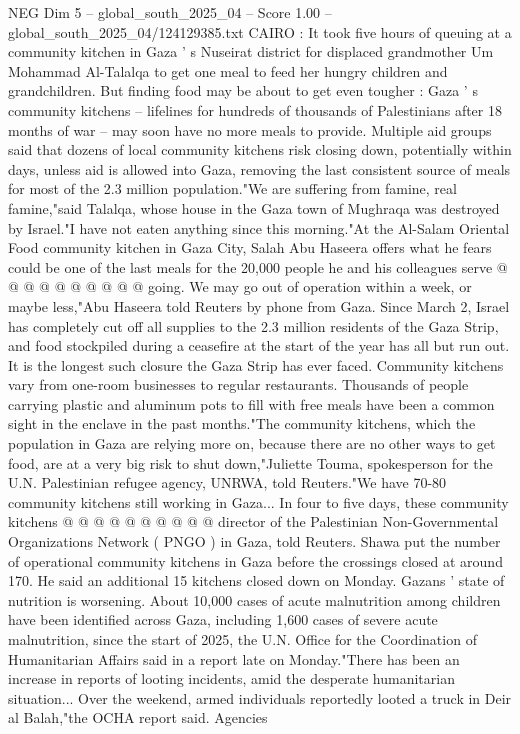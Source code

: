 \begin{textsample}{NEG Dim 5 – global\_south\_2025\_04 – Score 1.00 – global\_south\_2025\_04/124129385.txt}  \label{ex:f5_neg_366}
CAIRO : It took five hours of queuing at a community kitchen in Gaza ' s Nuseirat district for displaced grandmother Um Mohammad Al-Talalqa to get one meal to feed her hungry children and grandchildren.
But finding food may be about to get even tougher : Gaza ' s community kitchens -- lifelines for hundreds of thousands of Palestinians after 18 months of war -- may soon have no more meals to provide.
Multiple aid groups said that dozens of local community kitchens risk closing down, potentially within days, unless aid is allowed into Gaza, removing the last consistent source of meals for most of the 2.3 million population."We are suffering from famine, real famine,"said Talalqa, whose house in the Gaza town of Mughraqa was destroyed by Israel."I have not eaten anything since this morning."At the Al-Salam Oriental Food community kitchen in Gaza City, Salah Abu Haseera offers what he fears could be one of the last meals for the 20,000 people he and his colleagues serve @ @ @ @ @ @ @ @ @ @ going.
We may go out of operation within a week, or maybe less,"Abu Haseera told Reuters by phone from Gaza.
Since March 2, Israel has completely cut off all supplies to the 2.3 million residents of the Gaza Strip, and food stockpiled during a ceasefire at the start of the year has all but run out.
It is the longest such closure the Gaza Strip has ever faced.
Community kitchens vary from one-room businesses to regular restaurants.
Thousands of people carrying plastic and aluminum pots to fill with free meals have been a common sight in the enclave in the past months."The community kitchens, which the population in Gaza are relying more on, because there are no other ways to get food, are at a very big risk to shut down,"Juliette Touma, spokesperson for the U.N.
Palestinian refugee agency, UNRWA, told Reuters."We have 70-80 community kitchens still working in Gaza...
In four to five days, these community kitchens @ @ @ @ @ @ @ @ @ @ director of the Palestinian Non-Governmental Organizations Network ( PNGO ) in Gaza, told Reuters.
Shawa put the number of operational community kitchens in Gaza before the crossings closed at around 170.
He said an additional 15 kitchens closed down on Monday.
Gazans ' state of nutrition is worsening.
About 10,000 cases of acute malnutrition among children have been identified across Gaza, including 1,600 cases of severe acute malnutrition, since the start of 2025, the U.N.
Office for the Coordination of Humanitarian Affairs said in a report late on Monday."There has been an increase in reports of looting incidents, amid the desperate humanitarian situation...
Over the weekend, armed individuals reportedly looted a truck in Deir al Balah,"the OCHA report said.
Agencies

\end{textsample}
